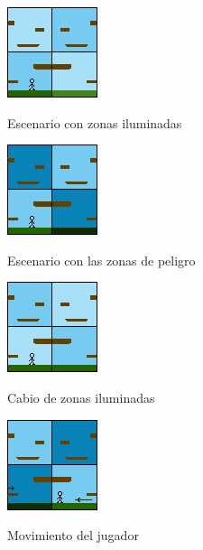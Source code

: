 \documentclass{article}
\begin{document}
\begin{figure}[h]
    \centering
    \caption{Escenario con zonas iluminadas}
    \includegraphics{sprite_1.png}
    \label{fig:my_label}
\end{figure}

\begin{figure}[h]
    \centering
    \caption{Escenario con las zonas de peligro}
    \includegraphics{sprite_2.png}
    \label{fig:my_label}
\end{figure}

\begin{figure}[h]
    \centering
    \caption{Cabio de zonas iluminadas}
    \includegraphics{sprite_3.png}
    \label{fig:my_label}
\end{figure}

\begin{figure}[h]
    \centering
    \caption{Movimiento del jugador}
    \includegraphics{sprite_4.png}
    \label{fig:my_label}
\end{figure}


\end{document}
